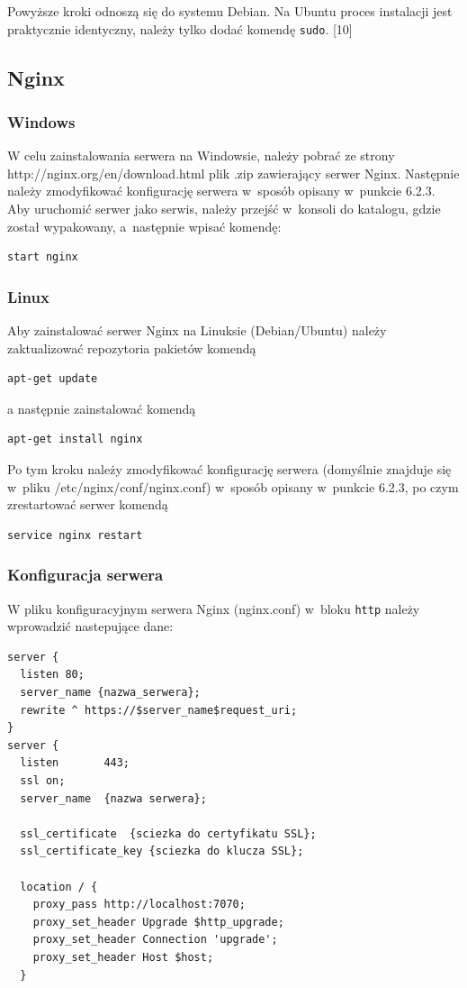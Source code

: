 \documentclass[8pt,a4paper,notitlepage]{article}
\begin{document}
Powyższe kroki odnoszą się do systemu Debian. Na Ubuntu proces instalacji jest praktycznie identyczny, należy tylko dodać komendę \texttt{sudo}. [10]

\subsection{Nginx}
\subsubsection{Windows}
W celu zainstalowania serwera na Windowsie, należy pobrać ze strony \\ http://nginx.org/en/download.html plik .zip zawierający serwer Nginx. Następnie należy zmodyfikować konfigurację serwera w~sposób opisany w~punkcie 6.2.3. Aby uruchomić serwer jako serwis, należy przejść w~konsoli do katalogu, gdzie został wypakowany, a~następnie wpisać komendę:
\begin{lstlisting}
start nginx
\end{lstlisting}

\subsubsection{Linux}
Aby zainstalować serwer Nginx na Linuksie (Debian/Ubuntu) należy zaktualizować repozytoria pakietów komendą
\begin{lstlisting}
apt-get update
\end{lstlisting}
a następnie zainstalować komendą
\begin{lstlisting}
apt-get install nginx
\end{lstlisting}
Po tym kroku należy zmodyfikować konfigurację serwera (domyślnie znajduje się w~pliku /etc/nginx/conf/nginx.conf) w~sposób opisany w~punkcie 6.2.3, po czym zrestartować serwer komendą
\begin{lstlisting}
service nginx restart
\end{lstlisting}

\subsubsection{Konfiguracja serwera}
W pliku konfiguracyjnym serwera Nginx (nginx.conf) w~bloku \texttt{http} należy wprowadzić nastepujące dane:
\begin{lstlisting}
server {
  listen 80;
  server_name {nazwa_serwera};
  rewrite ^ https://$server_name$request_uri;
}
server {
  listen       443;
  ssl on;
  server_name  {nazwa serwera};

  ssl_certificate  {sciezka do certyfikatu SSL};
  ssl_certificate_key {sciezka do klucza SSL};

  location / {
    proxy_pass http://localhost:7070;
    proxy_set_header Upgrade $http_upgrade;
    proxy_set_header Connection 'upgrade';
    proxy_set_header Host $host;
  }
\end{lstlisting}
\end{document}
